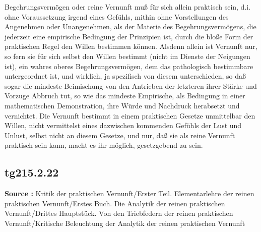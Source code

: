 \documentclass[a4paper,12pt,twoside]{book}
\begin{document}
Begehrungsvermögen oder reine Vernunft muß für sich allein praktisch sein, d.i. ohne Voraussetzung irgend eines Gefühls, mithin ohne Vorstellungen des Angenehmen oder Unangenehmen, als der Materie des Begehrungsvermögens, die jederzeit eine empirische Bedingung der Prinzipien ist, durch die bloße Form der praktischen Regel den Willen bestimmen können. Alsdenn allein ist Vernunft nur, so fern sie für sich selbst den Willen bestimmt (nicht im Dienste der Neigungen ist), ein wahres oberes Begehrungsvermögen, dem das pathologisch bestimmbare untergeordnet ist, und wirklich, ja spezifisch von diesem unterschieden, so daß sogar die mindeste Beimischung von den Antrieben der letzteren ihrer Stärke und Vorzuge Abbruch tut, so wie das mindeste Empirische, als Bedingung in einer mathematischen Demonstration, ihre Würde und Nachdruck herabsetzt und vernichtet. Die Vernunft bestimmt in einem praktischen Gesetze unmittelbar  den Willen, nicht vermittelst eines dazwischen kommenden Gefühls der Lust und Unlust, selbst nicht an diesem Gesetze, und nur, daß sie als reine Vernunft praktisch sein kann, macht es ihr möglich, gesetzgebend zu sein. 
	
	\subsection*{tg215.2.22} 
	\textbf{Source : }Kritik der praktischen Vernunft/Erster Teil. Elementarlehre der reinen praktischen Vernunft/Erstes Buch. Die Analytik der reinen praktischen Vernunft/Drittes Hauptstück. Von den Triebfedern der reinen praktischen Vernunft/Kritische Beleuchtung der Analytik der reinen praktischen Vernunft\\  
	
\end{document}
